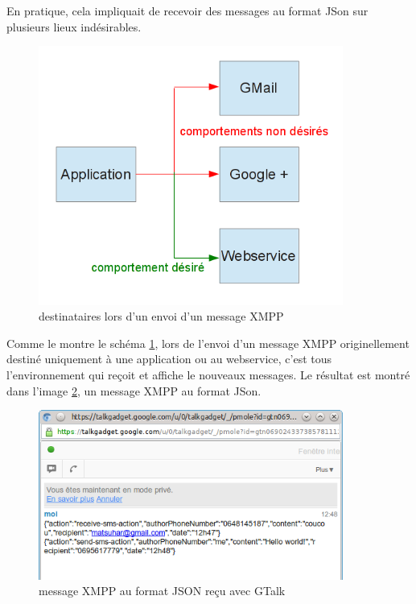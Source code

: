 En pratique, cela impliquait de recevoir des messages au format JSon sur plusieurs lieux indésirables.

\begin{figure}[!h]
	\center
	\includegraphics[width=10cm]{img/broadcast-xmpp.png}
	\caption{destinataires lors d'un envoi d'un message XMPP}
	\label{broadcast-xmpp}
\end{figure}

Comme le montre le schéma \ref{broadcast-xmpp}, lors de l'envoi d'un message XMPP originellement destiné uniquement
à une application ou au webservice, c'est tous l'environnement qui reçoit et affiche le nouveaux messages.
Le résultat est montré dans l'image \ref{message-xmpp-json-gmail}, un message XMPP au format JSon. 
	
\begin{figure}[!h]
	\center
	\includegraphics[width=10cm]{img/message-xmpp-json-gmail.png}
	\caption{message XMPP au format JSON reçu avec GTalk}
	\label{message-xmpp-json-gmail}
\end{figure}



